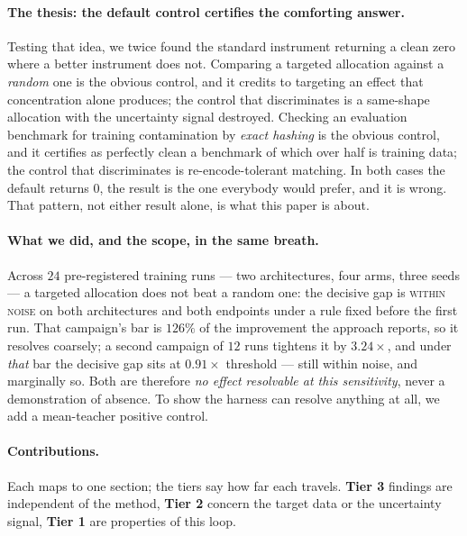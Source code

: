 \documentclass{article} %
\begin{document}
\paragraph{The thesis: the default control certifies the comforting answer.} Testing that idea, we
twice found the standard instrument returning a clean zero where a better instrument does not.
Comparing a targeted allocation against a \emph{random} one is the obvious control, and it credits to
targeting an effect that concentration alone produces; the control that discriminates is a same-shape
allocation with the uncertainty signal destroyed. Checking an evaluation benchmark for training
contamination by \emph{exact hashing} is the obvious control, and it certifies as perfectly clean a
benchmark of which over half is training data; the control that discriminates is re-encode-tolerant
matching. In both cases the default returns $0$, the result is the one everybody would prefer, and it
is wrong. That pattern, not either result alone, is what this paper is about.

\paragraph{What we did, and the scope, in the same breath.} Across $24$ pre-registered training runs
--- two architectures, four arms, three seeds --- a targeted allocation does not beat a random one:
the decisive gap is \textsc{within noise} on both architectures and both endpoints under a rule fixed
before the first run. That campaign's bar is $126\%$ of the improvement the approach reports, so it
resolves coarsely; a second campaign of $12$ runs tightens it by $3.24\times$, and under \emph{that}
bar the decisive gap sits at $0.91\times$ threshold --- still within noise, and marginally so. Both are
therefore \emph{no effect resolvable at this sensitivity}, never a demonstration of absence. To show
the harness can resolve anything at all, we add a mean-teacher positive control.

\paragraph{Contributions.} Each maps to one section; the tiers say how far each travels.
\textbf{Tier 3} findings are independent of the method, \textbf{Tier 2} concern the target data or the
uncertainty signal, \textbf{Tier 1} are properties of this loop.
\end{document}
